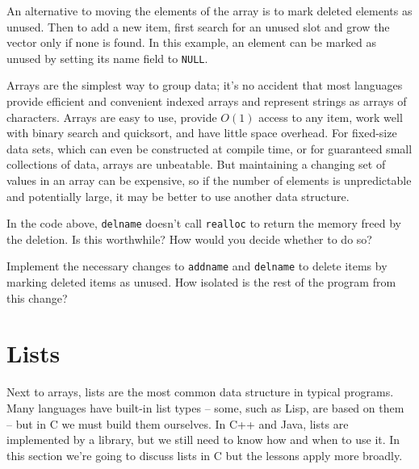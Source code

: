 An alternative to moving the elements of the array is to mark deleted
elements as unused. Then to add a new item, first search for an unused slot
and grow the vector only if none is found. In this example, an element can
be marked as unused by setting its name field to \verb'NULL'.

Arrays are the simplest way to group data; it's no accident that most
languages provide efficient and convenient indexed arrays and represent
strings as arrays of characters. Arrays are easy to use, provide $O(1)$
access to any item, work well with binary search and quicksort, and have
little space overhead. For fixed-size data sets, which can even be
constructed at compile time, or for guaranteed small collections of data,
arrays are unbeatable. But maintaining a changing set of values in an array
can be expensive, so if the number of elements is unpredictable and
potentially large, it may be better to use another data structure.

\begin{exercise}
In the code above, \verb'delname' doesn't call \verb'realloc' to return the
memory freed by the deletion. Is this worthwhile? How would you decide
whether to do so?
\end{exercise}

\begin{exercise}
Implement the necessary changes to \verb'addname' and \verb'delname' to
delete items by marking deleted items as unused. How isolated is the rest
of the program from this change?
\end{exercise}

\section{Lists}
\label{sec:lists}

Next to arrays, lists are the most common data structure in typical
programs. Many languages have built-in list types -- some, such as Lisp,
are based on them -- but in C we must build them ourselves. In C++ and
Java, lists are implemented by a library, but we still need to know how and
when to use it. In this section we're going to discuss lists in C but the
lessons apply more broadly.

